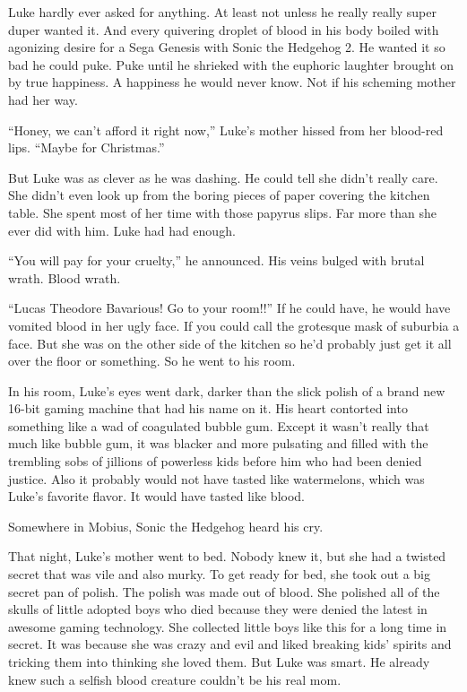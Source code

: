 Luke hardly ever asked for anything. At least not unless he really
really super duper wanted it. And every quivering droplet of blood
in his body boiled with agonizing desire for a Sega Genesis with
Sonic the Hedgehog 2. He wanted it so bad he could puke. Puke until
he shrieked with the euphoric laughter brought on by true
happiness. A happiness he would never know. Not if his scheming
mother had her way.



``Honey, we can't afford it right now,''
Luke's mother hissed from her blood-red lips. ``Maybe
for Christmas.''



But Luke was as clever as he was dashing. He could tell she
didn't really care. She didn't even look up from the
boring pieces of paper covering the kitchen table. She spent most
of her time with those papyrus slips. Far more than she ever did
with him. Luke had had enough.



``You will pay for your cruelty,'' he announced. His
veins bulged with brutal wrath. Blood wrath.



``Lucas Theodore Bavarious! Go to your room!!'' If he
could have, he would have vomited blood in her ugly face. If you
could call the grotesque mask of suburbia a face. But she was on
the other side of the kitchen so he'd probably just get it
all over the floor or something. So he went to his room.



In his room, Luke's eyes went dark, darker than the slick
polish of a brand new 16-bit gaming machine that had his name on
it. His heart contorted into something like a wad of coagulated
bubble gum. Except it wasn't really that much like bubble
gum, it was blacker and more pulsating and filled with the
trembling sobs of jillions of powerless kids before him who had
been denied justice. Also it probably would not have tasted like
watermelons, which was Luke's favorite flavor. It would have
tasted like blood.



Somewhere in Mobius, Sonic the Hedgehog heard his cry.



That night, Luke's mother went to bed. Nobody knew it, but
she had a twisted secret that was vile and also murky. To get ready
for bed, she took out a big secret pan of polish. The polish was
made out of blood. She polished all of the skulls of little adopted
boys who died because they were denied the latest in awesome gaming
technology. She collected little boys like this for a long time in
secret. It was because she was crazy and evil and liked breaking
kids' spirits and tricking them into thinking she loved them.
But Luke was smart. He already knew such a selfish blood creature
couldn't be his real mom.



